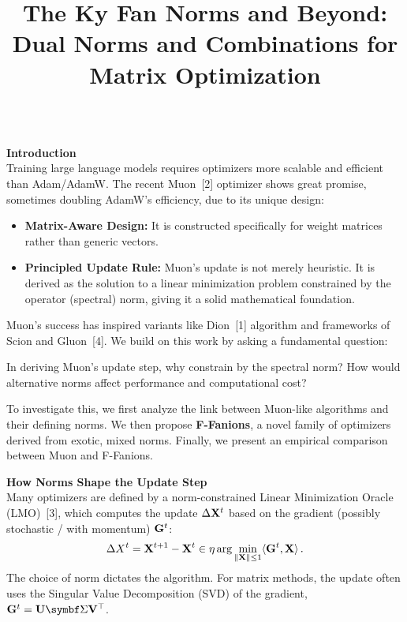 \documentclass[fontsize=10pt]{beamer}
\title{The Ky Fan Norms and Beyond: Dual Norms and Combinations for Matrix Optimization}
\begin{document}
\begin{frame}[fragile]
\begin{columns}[T]
\hspace{0.02\textwidth}%
\begin{column}{0.30\textwidth}
\setlength{\parskip}{0.7em}
\setlength{\parindent}{0pt}
\Large

\textbf{\Huge\color{Zen}Introduction}\\[0.3em]

Training large language models requires optimizers more scalable and efficient than Adam/AdamW. The recent Muon~[2] optimizer shows great promise, sometimes doubling AdamW's efficiency, due to its unique design:
\begin{itemize}
  \item \textbf{\color{HazySummerEve}Matrix-Aware Design:} It is constructed specifically for weight matrices rather than generic vectors.
  \item \textbf{\color{HazySummerEve}Principled Update Rule:} Muon's update is not merely heuristic. It is derived as the solution to a linear minimization problem constrained by the operator (spectral) norm, giving it a solid mathematical foundation.
\end{itemize}

Muon's success has inspired variants like Dion~[1] algorithm and frameworks of Scion and Gluon~[4]. We build on this work by asking a fundamental question:
\begin{attention}
In deriving Muon's update step, why constrain by the spectral norm? How would alternative norms affect performance and computational cost?
\end{attention}
To investigate this, we first analyze the link between Muon-like algorithms and their defining norms. We then propose \textbf{\color{HazySummerEve}F-Fanions}, a novel family of optimizers derived from exotic, mixed norms. Finally, we present an empirical comparison between Muon and F-Fanions.

\vspace{0.5em}
\textbf{\Huge\color{Zen}How Norms Shape the Update Step}\\[0.3em]

Many optimizers are defined by a norm-constrained Linear Minimization Oracle (LMO)~[3], which computes the update $\Delta\mathbf{X}^t$ based on the gradient (possibly stochastic / with momentum) $\mathbf{G}^t$:
\begin{equation*}
    \Delta X^t = \mathbf{X}^{t+1} - \mathbf{X}^t \in \eta \arg\min_{\Vert{\mathbf{X}}\Vert \leq 1} \langle{\mathbf{G}^t},{\mathbf{X}}\rangle\,.
\end{equation*}
The choice of norm dictates the algorithm. For matrix methods, the update often uses the Singular Value Decomposition (SVD) of the gradient, $\mG^t = \mU \mSigma \mV^\top$.


\end{column}
\end{columns}
\end{frame}
\end{document}
